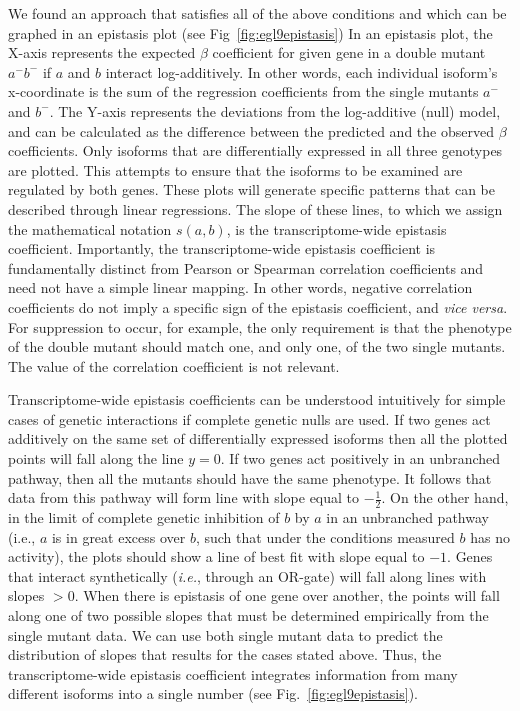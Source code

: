 We found an approach that satisfies all of the above conditions and which can be
graphed in an epistasis plot (see Fig~\ref{fig:egl9epistasis}) In an epistasis
plot, the X-axis represents the expected $\beta$ coefficient for given gene in a
double mutant $a^-b^-$ if $a$ and $b$ interact log-additively. In other words,
each individual isoform's x-coordinate is the sum of the regression coefficients
from the single mutants $a^-$ and $b^-$. The Y-axis represents the deviations
from the log-additive (null) model, and can be calculated as the difference
between the predicted and the observed $\beta$ coefficients. Only isoforms that
are differentially expressed in all three genotypes are plotted. This attempts
to ensure that the isoforms to be examined are regulated by both genes. These
plots will generate specific patterns that can be described through linear
regressions. The slope of these lines, to which we assign the mathematical
notation $s({a,b})$, is the transcriptome-wide epistasis coefficient.
Importantly, the transcriptome-wide epistasis coefficient is fundamentally
distinct from  Pearson or Spearman correlation coefficients and need not have a
simple linear mapping. In other words, negative correlation coefficients do not
imply a specific sign of the epistasis coefficient, and \emph{vice versa}. For
suppression to occur, for example, the only requirement is that the phenotype of
the double mutant should match one, and only one, of the two single mutants. The
value of the correlation coefficient is not relevant.

Transcriptome-wide epistasis coefficients can be understood intuitively for
simple cases of genetic interactions if complete genetic nulls are used. If two
genes act additively on the same set of differentially expressed isoforms then
all the plotted points will fall along the line $y=0$. If two genes act
positively in an unbranched pathway, then all the mutants should have the same
phenotype. It follows that data from this pathway will form line with slope
equal to $-\frac{1}{2}$. On the other hand, in the limit of complete genetic
inhibition of $b$ by $a$ in an unbranched pathway (i.e., $a$ is in great excess
over $b$, such that under the conditions measured $b$ has no activity), the
plots should show a line of best fit with slope equal to $-1$. Genes that
interact synthetically (\emph{i.e.}, through an OR-gate) will fall along lines
with slopes $>0$. When there is epistasis of one gene over another, the points
will fall along one of two possible slopes that must be determined empirically
from the single mutant data. We can use both single mutant data to predict the
distribution of slopes that results for the cases stated above. Thus, the
transcriptome-wide epistasis coefficient integrates information from many
different isoforms into a single number (see Fig.~\ref{fig:egl9epistasis}).

